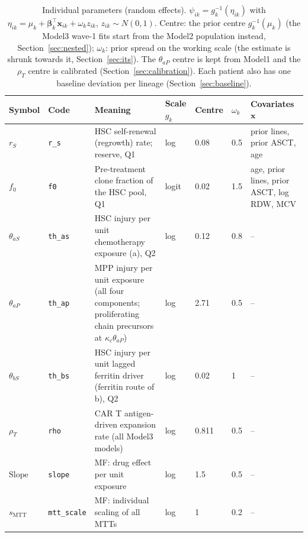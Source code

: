 \begin{table}[!htbp]
\centering
\footnotesize
\setlength{\tabcolsep}{3.5pt}
\caption{Individual parameters (random effects). $\psi_{ik}=g_k^{-1}(\eta_{ik})$ with $\eta_{ik}=\mu_k+\boldsymbol\beta_k^\top\mathbf{x}_{ik}+\omega_k z_{ik}$, $z_{ik}\sim N(0,1)$. Centre: the prior centre $g_k^{-1}(\mu_k)$ (the Model3 wave-1 fits start from the Model2 population instead, Section~\ref{sec:nested}); $\omega_k$: prior spread on the working scale (the estimate is shrunk towards it, Section~\ref{sec:its}). The $\theta_{aP}$ centre is kept from Model1 and the $\rho_T$ centre is calibrated (Section~\ref{sec:calibration}). Each patient also has one baseline deviation per lineage (Section~\ref{sec:baseline}).}
\label{tab:re}
\begin{tabular}{ll>{\raggedright\arraybackslash}p{5.4cm}lll>{\raggedright\arraybackslash}p{3.2cm}}
\toprule
Symbol & Code & Meaning & Scale $g_k$ & Centre & $\omega_k$ & Covariates $\mathbf{x}$ \\
\midrule
$r_S$ & \texttt{r\_s} & HSC self-renewal (regrowth) rate; reserve, Q1 & log & 0.08 & 0.5 & prior lines, prior ASCT, age \\
$f_0$ & \texttt{f0} & Pre-treatment clone fraction of the HSC pool, Q1 & logit & 0.02 & 1.5 & age, prior lines, prior ASCT, log RDW, MCV \\
$\theta_{aS}$ & \texttt{th\_as} & HSC injury per unit chemotherapy exposure (a), Q2 & log & 0.12 & 0.8 & -- \\
$\theta_{aP}$ & \texttt{th\_ap} & MPP injury per unit exposure (all four components; proliferating chain precursors at $\kappa_c\theta_{aP}$) & log & 2.71 & 0.5 & -- \\
$\theta_{bS}$ & \texttt{th\_bs} & HSC injury per unit lagged ferritin driver (ferritin route of b), Q2 & log & 0.02 & 1 & -- \\
$\rho_T$ & \texttt{rho} & CAR T antigen-driven expansion rate (all Model3 models) & log & 0.811 & 0.5 & -- \\
$\mathrm{Slope}$ & \texttt{slope} & MF: drug effect per unit exposure & log & 1.5 & 0.5 & -- \\
$s_{\mathrm{MTT}}$ & \texttt{mtt\_scale} & MF: individual scaling of all MTTs & log & 1 & 0.2 & -- \\
\bottomrule
\end{tabular}
\end{table}
